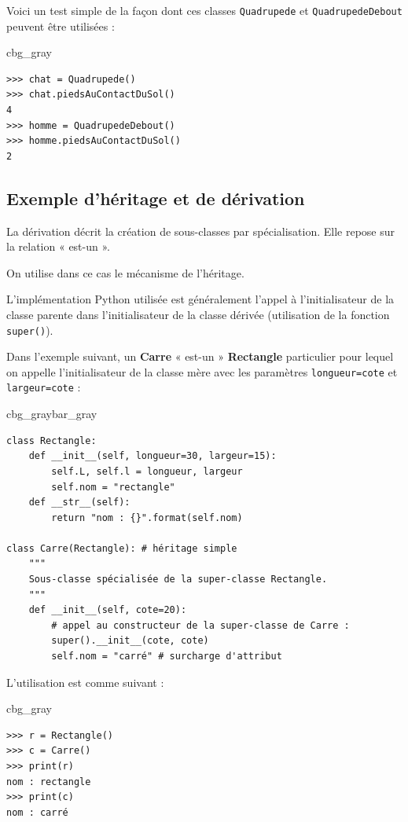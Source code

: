 \documentclass[%
oneside,                 %
final,                   %
10pt]{article}
\newenvironment{_cod_tight}[1]{
   \def\FrameCommand{\colorbox{#1}}
   \FrameRule0.6pt\MakeFramed {\FrameRestore}\vskip3mm}
   {\vskip0mm\endMakeFramed}
\newenvironment{cod}[1]{
\bgroup\rmfamily
\fboxsep=0mm\relax
\begin{_cod_tight}{#1}
\list{}{\parsep=-2mm\parskip=0mm\topsep=0pt\leftmargin=2mm
\rightmargin=2\leftmargin\leftmargin=4pt\relax}
\item\relax}
{\endlist\end{_cod_tight}\egroup}
\newenvironment{_pro_tight}[2]{
   \def\FrameCommand{\color{#2}\vrule width 1mm\normalcolor\colorbox{#1}}
   \FrameRule0.6pt\MakeFramed {\advance\hsize-2mm\FrameRestore}\vskip3mm}
   {\vskip0mm\endMakeFramed}
\newenvironment{pro}[2]{
\bgroup\rmfamily
\fboxsep=0mm\relax
\begin{_pro_tight}{#1}{#2}
\list{}{\parsep=-2mm\parskip=0mm\topsep=0pt\leftmargin=2mm
\rightmargin=2\leftmargin\leftmargin=4pt\relax}
\item\relax}
{\endlist\end{_pro_tight}\egroup}
\begin{document}
Voici un test simple de la façon dont ces classes \texttt{Quadrupede} et \texttt{QuadrupedeDebout} peuvent être utilisées :
\begin{cod}{cbg_gray}\begin{verbatim}
>>> chat = Quadrupede()
>>> chat.piedsAuContactDuSol()
4
>>> homme = QuadrupedeDebout()
>>> homme.piedsAuContactDuSol()
2
\end{verbatim}
\end{cod}
\noindent
\subsection{Exemple d'héritage et de dérivation}

La dérivation décrit la création de sous-classes par spécialisation. Elle repose sur la relation « est-un ».

On utilise dans ce cas le mécanisme de l'héritage.

L'implémentation Python utilisée est généralement l'appel à l'initialisateur de la classe parente dans l'initialisateur de la classe dérivée (utilisation de la fonction \texttt{super()}).

Dans l'exemple suivant, un \textbf{Carre} « est-un » \textbf{Rectangle} particulier pour lequel on appelle l'initialisateur de la classe mère avec les paramètres \texttt{longueur=cote} et \texttt{largeur=cote} :

\begin{pro}{cbg_gray}{bar_gray}\begin{verbatim}
class Rectangle:
    def __init__(self, longueur=30, largeur=15):
        self.L, self.l = longueur, largeur
        self.nom = "rectangle"
    def __str__(self):
        return "nom : {}".format(self.nom)

class Carre(Rectangle): # héritage simple
    """
    Sous-classe spécialisée de la super-classe Rectangle.
    """
    def __init__(self, cote=20):
        # appel au constructeur de la super-classe de Carre :
        super().__init__(cote, cote)
        self.nom = "carré" # surcharge d'attribut
\end{verbatim}
\end{pro}
\noindent

L'utilisation est comme suivant :

\begin{cod}{cbg_gray}\begin{verbatim}
>>> r = Rectangle()
>>> c = Carre()
>>> print(r)
nom : rectangle
>>> print(c)
nom : carré
\end{verbatim}
\end{cod}
\noindent
\end{document}
